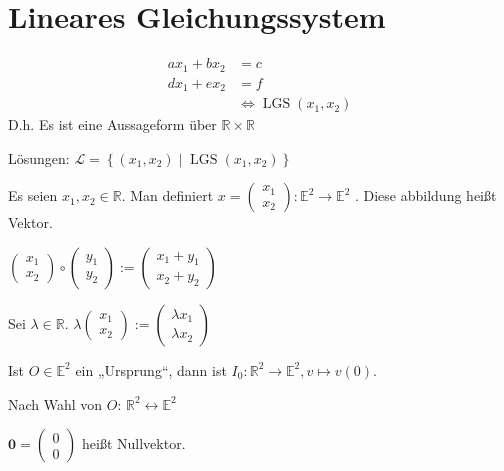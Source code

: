 
\chapter{Lineares Gleichungssystem}

\begin{example}
  \begin{align*}
    ax_1 + bx_2 &= c \\
    dx_1 + ex_2 &= f \\
    &\iff \operatorname{LGS}(x_1, x_2)
  \end{align*}
  D.h. Es ist eine Aussageform über $\mathbb{R} \times \mathbb{R}$

  Lösungen: $\mathscr{L} = \left\{ (x_1, x_2) \middle| \operatorname{LGS}(x_1, x_2) \right\}$
\end{example}

\begin{observation}[Geometrie]
  Es seien $x_1, x_2 \in \mathbb{R}$. Man definiert $x =
  \begin{pmatrix}
    x_1\\x_2
  \end{pmatrix}
  : \mathbb{E}^2 \to \mathbb{E}^2$
  . Diese abbildung heißt Vektor.
\end{observation}

\begin{definition}[Vektoraddition]
  $
  \begin{pmatrix}
    x_1\\x_2
  \end{pmatrix}
  \circ
  \begin{pmatrix}
    y_1\\y_2
  \end{pmatrix}
  :=
  \begin{pmatrix}
    x_1+y_1\\x_2+y_2
  \end{pmatrix}
  $
\end{definition}
\begin{definition}[Skalarmultiplikation]
  Sei $\lambda \in \mathbb{R}$.
  $\lambda
  \begin{pmatrix}
    x_1\\x_2
  \end{pmatrix}
  :=
  \begin{pmatrix}
    \lambda x_1 \\ \lambda x_2
  \end{pmatrix}
  $
\end{definition}
\begin{remark}
  Ist $O \in \mathbb{E}^2$ ein „Ursprung“, dann ist $I_0: \mathbb{R}^2 \to \mathbb{E}^2, v \mapsto v(0)$.

  Nach Wahl von $O$: $\mathbb{R}^2 \leftrightarrow \mathbb{E}^2$
\end{remark}
\begin{remark}
  $\mathbf{0} =
  \begin{pmatrix}
    0\\0
  \end{pmatrix}
  $ heißt Nullvektor.
\end{remark}

